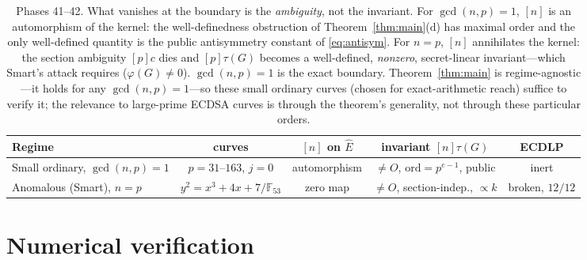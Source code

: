 \documentclass[11pt]{article}
\theoremstyle{definition}
\newcommand{\Ehat}{\widehat{E}}
\newcommand{\ord}{\mathrm{ord}}
\begin{document}
\begin{table}[t]
\centering
\small
\begin{tabular}{lcccc}
\toprule
Regime & curves & $[n]$ on $\Ehat$ & invariant $[n]\tau(G)$ & ECDLP\\
\midrule
Small ordinary, $\gcd(n,p)=1$ & $p=31$--$163$, $j{=}0$ & automorphism &
  $\neq O$, $\ord=p^{e-1}$, public & inert\\
Anomalous (Smart), $n=p$ & $y^2{=}x^3{+}4x{+}7/\mathbb F_{53}$ & zero map &
  $\neq O$, section-indep., $\propto k$ & broken, $12/12$\\
\bottomrule
\end{tabular}
\caption{Phases 41--42. What vanishes at the boundary is the
\emph{ambiguity}, not the invariant. For $\gcd(n,p)=1$, $[n]$ is an
automorphism of the kernel: the well-definedness obstruction of
Theorem~\ref{thm:main}(d) has maximal order and the only well-defined
quantity is the public antisymmetry constant of \eqref{eq:antisym}. For
$n=p$, $[n]$ annihilates the kernel: the section ambiguity $[p]c$ dies
and $[p]\tau(G)$ becomes a well-defined, \emph{nonzero}, secret-linear
invariant---which Smart's attack requires ($\varphi(G)\neq 0$).
$\gcd(n,p)=1$ is the exact boundary. Theorem~\ref{thm:main} is
regime-agnostic---it holds for any $\gcd(n,p)=1$---so these small ordinary
curves (chosen for exact-arithmetic reach) suffice to verify it; the
relevance to large-prime ECDSA curves is through the theorem's generality,
not through these particular orders.}
\label{tab:boundary}
\end{table}

\section{Numerical verification}\label{sec:verification}
\end{document}

